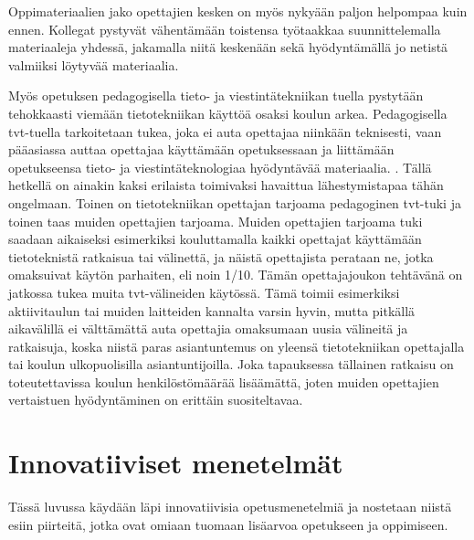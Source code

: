 \documentclass[utf8,bachelor]{gradu3}
\begin{document}
Oppimateriaalien jako opettajien kesken on myös nykyään paljon helpompaa kuin ennen. Kollegat pystyvät vähentämään toistensa työtaakkaa suunnittelemalla materiaaleja yhdessä, jakamalla niitä keskenään sekä hyödyntämällä jo netistä valmiiksi löytyvää materiaalia.

Myös opetuksen pedagogisella tieto- ja viestintätekniikan tuella pystytään tehokkaasti viemään tietotekniikan käyttöä osaksi koulun arkea. Pedagogisella tvt-tuella tarkoitetaan tukea, joka ei auta opettajaa niinkään teknisesti, vaan pääasiassa auttaa opettajaa käyttämään opetuksessaan ja liittämään opetukseensa tieto- ja viestintäteknologiaa hyödyntävää materiaalia. \parencite[][]{ritva}. Tällä hetkellä on ainakin kaksi erilaista toimivaksi havaittua lähestymistapaa tähän ongelmaan. Toinen on tietotekniikan opettajan tarjoama pedagoginen tvt-tuki ja toinen taas muiden opettajien tarjoama. Muiden opettajien tarjoama tuki saadaan aikaiseksi esimerkiksi kouluttamalla kaikki opettajat käyttämään tietoteknistä ratkaisua tai välinettä, ja näistä opettajista perataan ne, jotka omaksuivat käytön parhaiten, eli noin 1/10. Tämän opettajajoukon tehtävänä on jatkossa tukea muita tvt-välineiden käytössä. Tämä toimii esimerkiksi aktiivitaulun tai muiden laitteiden kannalta varsin hyvin, mutta pitkällä aikavälillä ei välttämättä auta opettajia omaksumaan uusia välineitä ja ratkaisuja, koska niistä paras asiantuntemus on yleensä tietotekniikan opettajalla tai koulun ulkopuolisilla asiantuntijoilla. Joka tapauksessa tällainen ratkaisu on toteutettavissa koulun henkilöstömäärää lisäämättä, joten muiden opettajien vertaistuen hyödyntäminen on erittäin suositeltavaa.

\chapter{Innovatiiviset menetelmät}
Tässä luvussa käydään läpi innovatiivisia opetusmenetelmiä ja nostetaan niistä esiin piirteitä, jotka ovat omiaan tuomaan lisäarvoa opetukseen ja oppimiseen.
\end{document}
